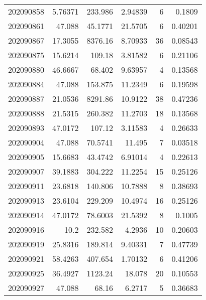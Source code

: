 \begin{tabular}{rrrrrr}
 202090858 &          5.76371 &      233.986  &            2.94839 &           6 & 0.1809  \\
 202090861 &         47.088   &       45.1771 &           21.5705  &           6 & 0.40201 \\
 202090867 &         17.3055  &     8376.16   &            8.70933 &          36 & 0.08543 \\
 202090875 &         15.6214  &      109.18   &            3.81582 &           6 & 0.21106 \\
 202090880 &         46.6667  &       68.402  &            9.63957 &           4 & 0.13568 \\
 202090884 &         47.088   &      153.875  &           11.2349  &           6 & 0.19598 \\
 202090887 &         21.0536  &     8291.86   &           10.9122  &          38 & 0.47236 \\
 202090888 &         21.5315  &      260.382  &           11.2703  &          18 & 0.13568 \\
 202090893 &         47.0172  &      107.12   &            3.11583 &           4 & 0.26633 \\
 202090904 &         47.088   &       70.5741 &           11.495   &           7 & 0.03518 \\
 202090905 &         15.6683  &       43.4742 &            6.91014 &           4 & 0.22613 \\
 202090907 &         39.1883  &      304.222  &           11.2254  &          15 & 0.25126 \\
 202090911 &         23.6818  &      140.806  &           10.7888  &           8 & 0.38693 \\
 202090913 &         23.6104  &      229.209  &           10.4974  &          16 & 0.25126 \\
 202090914 &         47.0172  &       78.6003 &           21.5392  &           8 & 0.1005  \\
 202090916 &         10.2     &      232.582  &            4.2936  &          10 & 0.20603 \\
 202090919 &         25.8316  &      189.814  &            9.40331 &           7 & 0.47739 \\
 202090921 &         58.4263  &      407.654  &            1.70132 &           6 & 0.41206 \\
 202090925 &         36.4927  &     1123.24   &           18.078   &          20 & 0.10553 \\
 202090927 &         47.088   &       68.16   &            6.2717  &           5 & 0.36683 \\

\end{tabular}
